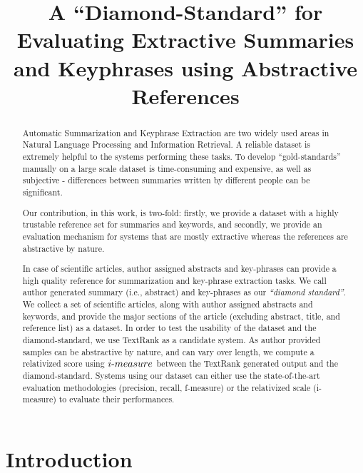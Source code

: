 \documentclass{sig-alternate-05-2015}
\begin{document}
\title{A ``Diamond-Standard'' for Evaluating Extractive Summaries and Keyphrases using Abstractive References}
\maketitle
\begin{abstract}
Automatic Summarization and Keyphrase Extraction are two widely used areas in Natural Language Processing and Information Retrieval. A reliable dataset is extremely helpful to the systems performing these tasks. To develop ``gold-standards'' manually on a large scale dataset is time-consuming and expensive, as well as subjective - differences between summaries written by different people can be significant. 

Our contribution, in this work, is two-fold: firstly, we provide a dataset with a highly trustable reference set for summaries and keywords, and secondly, we provide an evaluation mechanism for systems that are mostly extractive whereas the references are abstractive by nature.

\par In case of scientific articles, author assigned abstracts and key-phrases can provide a high quality reference for summarization and key-phrase extraction tasks. We call author generated summary (i.e., abstract) and key-phrases as our \emph{``diamond standard''}. We collect a set of scientific articles, along with author assigned abstracts and keywords, and provide the major sections of the article (excluding abstract, title, and reference list) as a dataset. In order to test the usability of the dataset and the diamond-standard, we use TextRank as a candidate system. As author provided samples can be abstractive by nature, and can vary over length, we compute a relativized score using $i\hbox{-}measure$ between the TextRank generated output and the diamond-standard. Systems using our dataset can either use the state-of-the-art evaluation methodologies (precision, recall, f-measure) or the relativized scale (i-measure) to evaluate their performances.
\end{abstract}

\section{Introduction}
\end{document}
